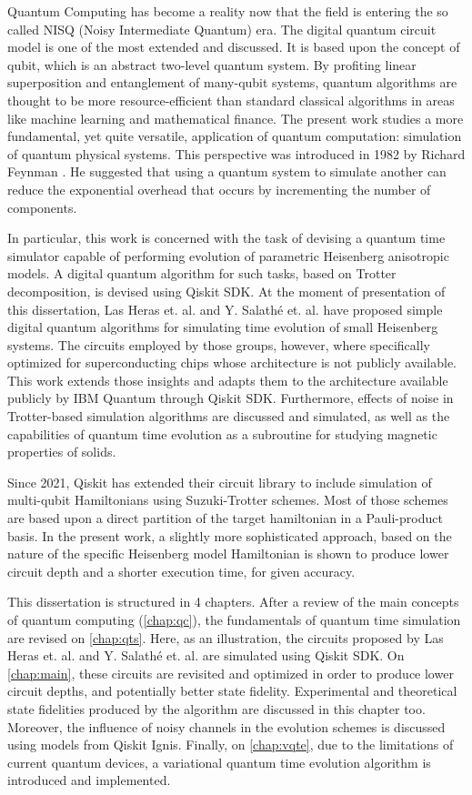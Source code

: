 Quantum Computing has become a reality now that the field is entering the so called NISQ (Noisy Intermediate Quantum) era. The digital quantum circuit model is one of the most extended and discussed. It is based upon the concept of qubit, which is an abstract two-level quantum system. By profiting linear superposition and entanglement of many-qubit systems, quantum algorithms are thought to be more resource-efficient than standard classical algorithms in areas like machine learning and mathematical finance. The present work studies a more fundamental, yet quite versatile, application of quantum computation: simulation of quantum physical systems. This perspective was introduced in 1982 by Richard Feynman \cite{Feynman1982}. He suggested that using a quantum system to simulate another can reduce the exponential overhead that occurs by incrementing the number of components. 

In particular, this work is concerned with the task of devising a quantum time simulator capable of performing evolution of parametric Heisenberg anisotropic models. A digital quantum algorithm for such tasks, based on Trotter decomposition, is devised using Qiskit SDK. At the moment of presentation of this dissertation, Las Heras et. al. \cite{HubbardSimulLasHeras} and Y. Salathé et. al. \cite{HeisenbergSimulLasHeras} have proposed simple digital quantum algorithms for simulating time evolution of small Heisenberg systems. The circuits employed by those groups, however, where specifically optimized for superconducting chips whose architecture is not publicly available. This work extends those insights and adapts them to the architecture available publicly by IBM Quantum through Qiskit SDK. Furthermore, effects of noise in Trotter-based simulation algorithms are discussed and simulated, as well as the capabilities of quantum time evolution as a subroutine for studying magnetic properties of solids.

Since 2021, Qiskit has extended their circuit library to include simulation of multi-qubit Hamiltonians using Suzuki-Trotter schemes. Most of those schemes are based upon a direct partition of the target hamiltonian in a Pauli-product basis. In the present work, a slightly more sophisticated approach, based on the nature of the specific Heisenberg model Hamiltonian is shown to produce lower circuit depth and a shorter execution time, for given accuracy.

This dissertation is structured in 4 chapters. After a review of the main concepts of quantum computing (\autoref{chap:qc}), the fundamentals of quantum time simulation are revised on \autoref{chap:qts}. Here, as an illustration, the circuits proposed by Las Heras et. al. \cite{HubbardSimulLasHeras} and Y. Salathé et. al. \cite{HeisenbergSimulLasHeras} are simulated using Qiskit SDK. On \autoref{chap:main}, these circuits are revisited and optimized in order to produce lower circuit depths, and potentially better state fidelity. Experimental and theoretical state fidelities produced by the algorithm are discussed in this chapter too. Moreover, the influence of noisy channels in the evolution schemes is discussed using models from Qiskit Ignis. Finally, on \autoref{chap:vqte}, due to the limitations of current quantum devices, a variational quantum time evolution algorithm is introduced and implemented.